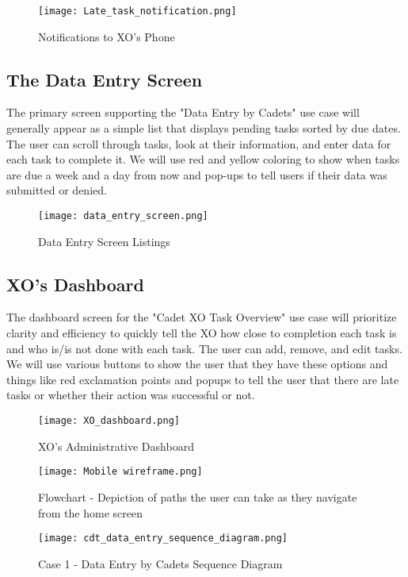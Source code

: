 \documentclass [11pt]{article}
\begin{document}
\begin{figure}[H]
    \centering
    \texttt{[image: Late\_task\_notification.png]}
    \caption{Notifications to XO's Phone}
    \label{fig:enter-label}
\end{figure}

\subsection{The Data Entry Screen}
The primary screen supporting the "Data Entry by Cadets" use case will generally appear as a simple list that displays pending tasks sorted by due dates. The user can scroll through tasks, look at their information, and enter data for each task to complete it. We will use red and yellow coloring to show when tasks are due a week and a day from now and pop-ups to tell users if their data was submitted or denied.
\begin{figure}[H]
    \centering
    \texttt{[image: data\_entry\_screen.png]}
    \caption{Data Entry Screen Listings}
    \label{fig:enter-label}
\end{figure}

\subsection{XO's Dashboard}
The dashboard screen for the "Cadet XO Task Overview" use case will prioritize clarity and efficiency to quickly tell the XO how close to completion each task is and who is/is not done with each task. The user can add, remove, and edit tasks. We will use various buttons to show the user that they have these options and things like red exclamation points and popups to tell the user that there are late tasks or whether their action was successful or not.

\begin{figure}[H]
    \centering
    \texttt{[image: XO\_dashboard.png]}
    \caption{XO's Administrative Dashboard}
    \label{fig:enter-label}
\end{figure}

\begin{figure}[H]
    \centering
    \texttt{[image: Mobile wireframe.png]}
    \caption{Flowchart - Depiction of paths the user can take as they navigate from the home screen}
    \label{fig:flowchart}
\end{figure}

\begin{figure}[H]
    \centering
    \texttt{[image: cdt\_data\_entry\_sequence\_diagram.png]}
    \caption{Case 1 - Data Entry by Cadets Sequence Diagram\cite{seqdia}}
    \label{fig:seq_dia1}
\end{figure}
\end{document}
